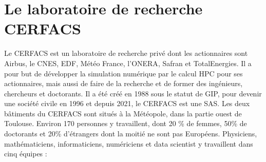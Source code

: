\chapter{Le laboratoire de recherche CERFACS}





Le CERFACS est un laboratoire de recherche privé dont les actionnaires sont\label{actionnaires} Airbus, le \ac{CNES}, \ac{EDF}, Météo France, l'\ac{ONERA}, Safran et TotalEnergies. Il a pour but de développer la simulation numérique par le calcul HPC pour ses actionnaires, mais aussi de faire de la recherche et de former des ingénieurs, chercheurs et doctorants. Il a été créé en 1988 sous le statut de \ac{GIP}, pour devenir une société civile en 1996 et depuis 2021, le CERFACS est une \ac{SAS}.
Les deux bâtiments du CERFACS sont situés à la Météopole, dans la partie ouest de Toulouse. Environ 170 personnes y travaillent, dont 20 \% de femmes, 50\% de doctorants et 20\% d'étrangers dont la moitié ne sont pas Européens.
Physiciens, mathématiciens, informaticiens, numériciens et data scientist y travaillent dans cinq équipes :

